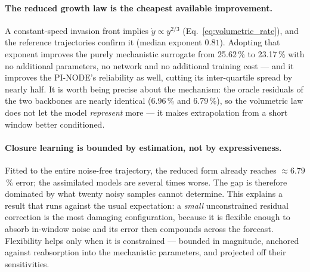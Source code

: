 \paragraph{The reduced growth law is the cheapest available improvement.} A
constant-speed invasion front implies $\dot y\propto y^{2/3}$
(Eq.~\eqref{eq:volumetric_rate}), and the reference trajectories confirm it
(median exponent $0.81$). Adopting that exponent improves the purely
mechanistic surrogate from 25.62\,\% to 23.17\,\% with no additional
parameters, no network and no additional training cost --- and it improves the
PI-NODE's reliability as well, cutting its inter-quartile spread by nearly half.
It is worth being precise about the mechanism: the oracle residuals of the two
backbones are nearly identical (6.96\,\% and 6.79\,\%), so the
volumetric law does not let the model \emph{represent} more --- it makes
extrapolation from a short window better conditioned.

\paragraph{Closure learning is bounded by estimation, not by expressiveness.}
Fitted to the entire noise-free trajectory, the reduced form already reaches
$\approx6.79$\,\% error; the assimilated models are several times
worse. The gap is therefore dominated by what twenty noisy samples cannot
determine. This explains a result that runs against the usual expectation: a
\emph{small} unconstrained residual correction is the most damaging
configuration, because it is flexible enough to absorb in-window noise and its
error then compounds across the forecast. Flexibility helps only when it is
constrained --- bounded in magnitude, anchored against reabsorption into the
mechanistic parameters, and projected off their sensitivities.

